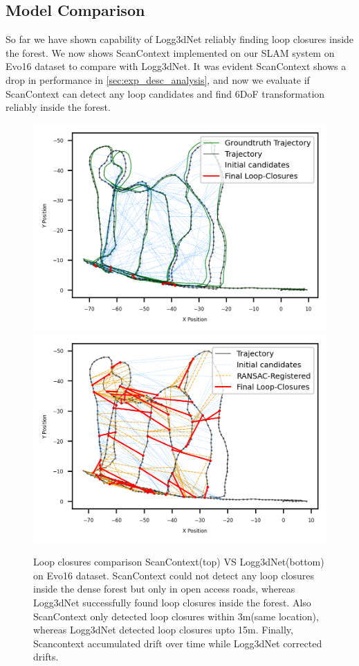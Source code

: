 \subsection*{Model Comparison}
So far we have shown capability of Logg3dNet reliably finding loop closures inside the forest. We now shows ScanContext implemented on our SLAM system on Evo16 dataset to compare with Logg3dNet. It was evident ScanContext shows a drop in performance in \ref{sec:exp_desc_analysis}, and now we evaluate if ScanContext can detect any loop candidates and find 6DoF transformation reliably inside the forest.  
\begin{figure}[htbp]
  \centering
  \includegraphics[width=0.9\columnwidth]{pics/exp_2_sc_loop_closure.png}
  \includegraphics[width=0.9\columnwidth]{pics/exp_2_logg3dnet_loop_closure.png}
  \caption{Loop closures comparison ScanContext(top) VS Logg3dNet(bottom) on Evo16 dataset. ScanContext could not detect any loop closures inside the dense forest but only in open access roads, whereas Logg3dNet successfully found loop closures inside the forest. Also ScanContext only detected loop closures within 3m(same location), whereas Logg3dNet detected loop closures upto 15m. Finally, Scancontext accumulated drift over time while Logg3dNet corrected drifts.}
  \label{fig:exp_2_3_loop_closure_comparison}
\end{figure}

